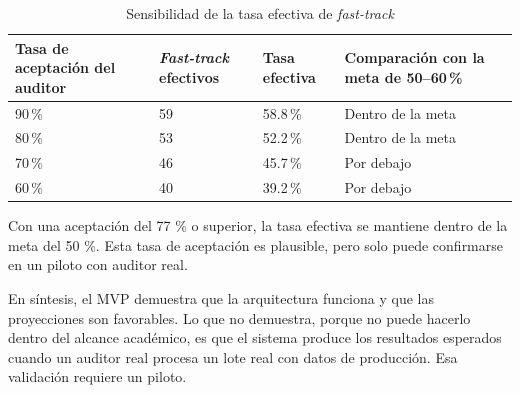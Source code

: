 \begin{table}[H]
    \centering
    \caption{Sensibilidad de la tasa efectiva de \textit{fast-track}}
    \label{tab:sensibilidad-fast-track-efectivo}

    \footnotesize
    \setlength{\tabcolsep}{7pt}
    \renewcommand{\arraystretch}{1.25}

    \begin{tabular}{
        p{}
        p{}
        p{}
        p{}
    }
        \toprule
        \textbf{Tasa de aceptación del auditor}
        & \textbf{\textit{Fast-track} efectivos}
        & \textbf{Tasa efectiva}
        & \textbf{Comparación con la meta de 50--60\,\%} \\
        \midrule

        90\,\%
        & 59
        & 58.8\,\%
        & Dentro de la meta \\

        80\,\%
        & 53
        & 52.2\,\%
        & Dentro de la meta \\

        70\,\%
        & 46
        & 45.7\,\%
        & Por debajo \\

        60\,\%
        & 40
        & 39.2\,\%
        & Por debajo \\

        \bottomrule
    \end{tabular}
\end{table}

Con una aceptación del 77 \% o superior, la tasa efectiva se mantiene dentro de la meta del 50 \%. Esta tasa de aceptación es plausible, pero solo puede confirmarse en un piloto con auditor real.

En síntesis, el MVP demuestra que la arquitectura funciona y que las proyecciones son favorables. Lo que no demuestra, porque no puede hacerlo dentro del alcance académico, es que el sistema produce los resultados esperados cuando un auditor real procesa un lote real con datos de producción. Esa validación requiere un piloto.
